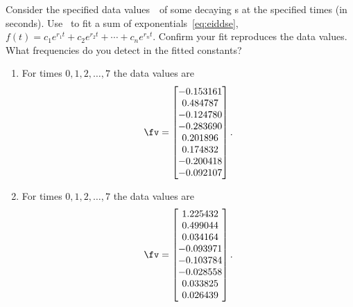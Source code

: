 \begin{exercise} \label{ex:} 
Consider the specified data values~\fv\ of some decaying s at the specified times (in seconds).
Use \script\ to fit a sum of exponentials~\eqref{eq:eiddse}, \(f(t)=c_1e^{r_1t}+c_2e^{r_2t}+\cdots+c_ne^{r_nt}\).
Confirm your fit reproduces the data values.
What frequencies do you detect in the fitted constants?
\begin{enumerate}
\item  For times \(0,1,2,\ldots,7\) the data values are 
\setbox\ajrqrbox\hbox{}\marginpar{\usebox{\ajrqrbox}}%
\[ \fv=\begin{bmatrix} -0.153161
\\  0.484787
\\ -0.124780
\\ -0.283690
\\  0.201896
\\  0.174832
\\ -0.200418
\\ -0.092107 \end{bmatrix}.\]
  
\item  For times \(0,1,2,\ldots,7\) the data values are 
\setbox\ajrqrbox\hbox{}\marginpar{\usebox{\ajrqrbox}}%
\[ \fv=\begin{bmatrix} 1.225432
\\  0.499044
\\  0.034164
\\ -0.093971
\\ -0.103784
\\ -0.028558
\\  0.033825
\\  0.026439 \end{bmatrix}.\]
  

\end{enumerate}
\end{exercise}
